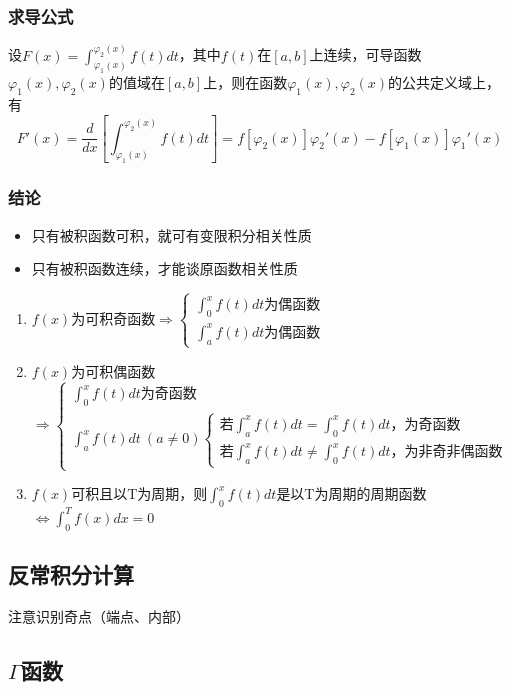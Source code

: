 \subsubsection{求导公式}
设\(F(x) = \displaystyle\int_{\varphi_1(x)}^{\varphi_2(x)}f(t)dt\)，其中\(f(t)\)在\([a, b]\)上连续，可导函数\(\varphi_1(x), \varphi_2(x)\)的值域在\([a, b]\)上，则在函数\(\varphi_1(x), \varphi_2(x)\)的公共定义域上，有\[F'(x) = \dfrac{d}{dx}[\int_{\varphi_1(x)}^{\varphi_2(x)}f(t)dt] = f[\varphi_2(x)]\varphi_2'(x) - f[\varphi_1(x)]\varphi_1'(x)\]

\subsubsection{结论}
\begin{itemize}
    \item 只有被积函数可积，就可有变限积分相关性质
    \item 只有被积函数连续，才能谈原函数相关性质
\end{itemize}
\begin{enumerate}
    \item \(f(x)\)为可积奇函数\(\Rightarrow \begin{cases}
        \int_0^xf(t)dt\text{为偶函数} \\ 
        \int_a^xf(t)dt\text{为偶函数}
    \end{cases}\)
    \item \(f(x)\)为可积偶函数\(\Rightarrow \begin{cases}
        \int_0^xf(t)dt\text{为奇函数} \\ 
        \int_a^xf(t)dt\ (a \neq 0) \begin{cases}
            \text{若}\int_a^xf(t)dt = \int_0^xf(t)dt\text{，为奇函数} \\ 
            \text{若}\int_a^xf(t)dt \neq \int_0^xf(t)dt\text{，为非奇非偶函数}
        \end{cases}
    \end{cases}\)
    \item \(f(x)\)可积且以T为周期，则\(\int_0^xf(t)dt\)是以T为周期的周期函数\(\Leftrightarrow \int_0^Tf(x)dx = 0\)
\end{enumerate}


\subsection{反常积分计算}
注意识别奇点（端点、内部）


\subsection{\(\Gamma\)函数}
